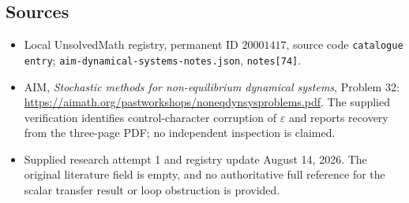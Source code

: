 \documentclass[11pt]{article}
\begin{document}
\subsection{Sources}
\begin{itemize}
\item Local UnsolvedMath registry, permanent ID \(20001417\), source code \texttt{catalogue entry}; \texttt{aim-dynamical-systems-notes.json}, \texttt{notes[74]}.
\item AIM, \emph{Stochastic methods for non-equilibrium dynamical systems}, Problem 32: \url{https://aimath.org/pastworkshops/noneqdynsysproblems.pdf}. The supplied verification identifies control-character corruption of \(\varepsilon\) and reports recovery from the three-page PDF; no independent inspection is claimed.
\item Supplied research attempt 1 and registry update August 14, 2026. The original literature field is empty, and no authoritative full reference for the scalar transfer result or loop obstruction is provided.
\end{itemize}
\end{document}
